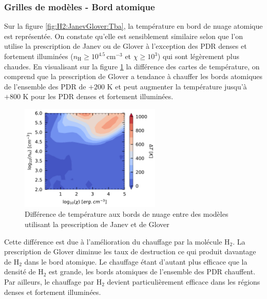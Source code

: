\subsubsection{Grilles de modèles - Bord atomique}

Sur la figure \ref{fig:H2:JanevGlover:Tba}, la température en bord de nuage atomique est représentée. On constate qu'elle est sensiblement similaire selon que l'on utilise la prescription de Janev ou de Glover à l'exception des PDR denses et fortement illuminées ($n_\mathrm{H} \geq 10^{4.5} \, \mathrm{cm}^{-3}$ et $\chi \geq 10^3$) qui sont légèrement plus chaudes. En visualisant sur la figure \ref{fig:H2:JanevGlover:diffTba} la différence des cartes de température, on comprend que la prescription de Glover a tendance à chauffer les bords atomiques de l'ensemble des PDR de $+200$ K et peut augmenter la température jusqu'à $+800$ K pour les PDR denses et fortement illuminées. \newline

\begin{figure}[!h]
    \centering \includegraphics[trim = {0 0 0 0 },clip,width=0.6\textwidth]{figure/H2/diffgrid_gloverjanev/mapTba_H2_n_1p7_nobossion_noCl155_n.pdf}
    \caption{Différence de température aux bords de nuage entre des modèles utilisant la prescription de Janev et de Glover}
    \label{fig:H2:JanevGlover:diffTba}
\end{figure}

Cette différence est due à l'amélioration du chauffage par la molécule $\mathrm{H}_2$. La prescription de Glover diminue les taux de destruction ce qui produit davantage de $\mathrm{H}_2$ dans le bord atomique. Le chauffage étant d'autant plus efficace que la densité de $\mathrm{H}_2$ est grande, les bords atomiques de l'ensemble des PDR chauffent. Par ailleurs, le chauffage par $\mathrm{H}_2$ devient particulièrement efficace dans les régions denses et fortement illuminées. \newline

